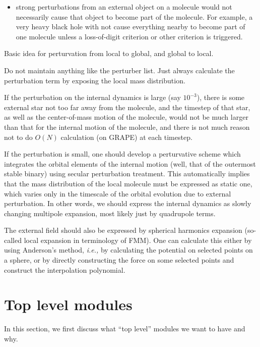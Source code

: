 \documentclass{article}[12pt]
\begin{document}
\begin{itemize}
\item strong perturbations from an external object on a molecule
   would not necessarily cause that object to become part of
   the molecule.  For example, a very heavy black hole with not
   cause everything nearby to become part of one molecule unless
   a loss-of-digit criterion or other criterion is triggered.
\end{itemize}

Basic idea for perturvation from local to global, and global to
local.

Do not maintain anything like the perturber list. Just always
calculate the perturbation term by exposing the local mass
distribution.

If the perturbation on the internal dynamics is large (say $10^{-3}$),
there is some external star not too far away from the molecule, and
the timestep of that star, as well as the center-of-mass motion of the
molecule, would not be much larger than that for the internal motion
of the molecule, and there is not much reason not to do $O(N)$
calculation (on GRAPE) at each timestep.

If the perturbation is small, one should develop a perturvative scheme
which integrates the orbital elements of the internal motion (well,
that of the outermost stable binary) using secular perturbation
treatment. This automatically implies that  the mass distribution of
the local molecule must be expressed as static one, which varies only
in the timescale of the orbital evolution due to external
perturbation. In other words, we should express the internal dynamics
as slowly changing multipole expansion, most likely just by quadrupole
terms.

The external field should also be expressed by spherical harmonics
expansion (so-called local expansion in terminology of FMM). One can
calculate this either by using Anderson's method, {\it i.e.,} by
calculating the potential on selected points on a sphere, or by
directly constructing the force on some selected points and construct
the interpolation polynomial. 



\newpage

\section{Top level modules}

In this section, we first discuss what ``top level'' modules we want
to have and why.
\end{document}

